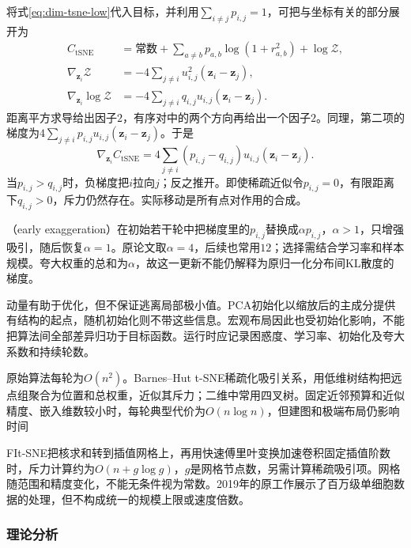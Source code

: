 将式\eqref{eq:dim-tsne-low}代入目标，并利用$\sum_{i\ne j}p_{i,j}=1$，可把与坐标有关的部分展开为
\begin{equation}
  \label{eq:dim-tsne-gradient-derivation}
  \begin{aligned}
    C_{\mathrm{tSNE}}
      &=\text{常数}
        +\sum_{a\ne b}p_{a,b}\log(1+r_{a,b}^2)
        +\log\mathcal{Z},\\
    \nabla_{\bm{z}_i}\mathcal{Z}
      &=-4\sum_{j\ne i}u_{i,j}^2(\bm{z}_i-\bm{z}_j),\\
    \nabla_{\bm{z}_i}\log\mathcal{Z}
      &=-4\sum_{j\ne i}q_{i,j}u_{i,j}(\bm{z}_i-\bm{z}_j).
  \end{aligned}
\end{equation}
距离平方求导给出因子$2$，有序对中的两个方向再给出一个因子$2$。同理，第二项的梯度为$4\sum_{j\ne i}p_{i,j}u_{i,j}(\bm{z}_i-\bm{z}_j)$。于是
\begin{equation}
  \label{eq:dim-tsne-gradient}
  \nabla_{\bm{z}_i}C_{\mathrm{tSNE}}
    =4\sum_{j\ne i}(p_{i,j}-q_{i,j})u_{i,j}
      (\bm{z}_i-\bm{z}_j).
\end{equation}
当$p_{i,j}>q_{i,j}$时，负梯度把$i$拉向$j$；反之推开。即使稀疏近似令$p_{i,j}=0$，有限距离下$q_{i,j}>0$，斥力仍然存在。实际移动是所有点对作用的合成。

（early exaggeration）在初始若干轮中把梯度里的$p_{i,j}$替换成$\alpha p_{i,j}$，$\alpha>1$，只增强吸引，随后恢复$\alpha=1$。原论文取$\alpha=4$，后续也常用$12$；选择需结合学习率和样本规模。夸大权重的总和为$\alpha$，故这一更新不能仍解释为原归一化分布间KL散度的梯度。

动量有助于优化，但不保证逃离局部极小值。PCA初始化以缩放后的主成分提供有结构的起点，随机初始化则不带这些信息。宏观布局因此也受初始化影响，不能把算法间全部差异归功于目标函数。运行时应记录困惑度、学习率、初始化及夸大系数和持续轮数。

原始算法每轮为$O(n^2)$。Barnes--Hut t-SNE稀疏化吸引关系，用低维树结构把远点组聚合为位置和总权重，近似其斥力；二维中常用四叉树。固定近邻预算和近似精度、嵌入维数较小时，每轮典型代价为$O(n\log n)$，但建图和极端布局仍影响时间

FIt-SNE把核求和转到插值网格上，再用快速傅里叶变换加速卷积固定插值阶数时，斥力计算约为$O(n+g\log g)$，$g$是网格节点数，另需计算稀疏吸引项。网格随范围和精度变化，不能无条件视为常数。2019年的原工作展示了百万级单细胞数据的处理，但不构成统一的规模上限或速度倍数。

\subsubsection{理论分析}
\label{sec:dim-tsne-theory}

